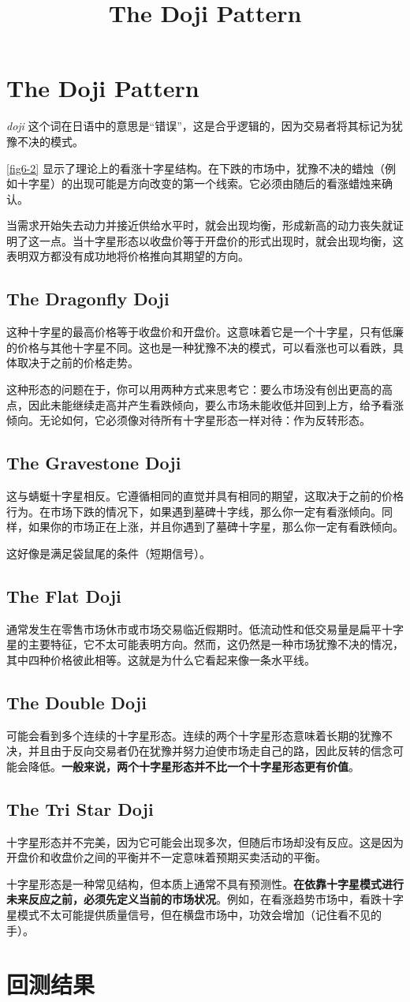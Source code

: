 \documentclass{article}
\title{The Doji Pattern}
\begin{document}
\section*{The Doji Pattern}
\textit{doji} 这个词在日语中的意思是“错误”，这是合乎逻辑的，因为交易者将其标记为犹豫不决的模式。


\autoref{fig6-2} 显示了理论上的看涨十字星结构。在下跌的市场中，犹豫不决的蜡烛（例如十字星）的出现可能是方向改变的第一个线索。它必须由随后的看涨蜡烛来确认。

当需求开始失去动力并接近供给水平时，就会出现均衡，形成新高的动力丧失就证明了这一点。当十字星形态以收盘价等于开盘价的形式出现时，就会出现均衡，这表明双方都没有成功地将价格推向其期望的方向。
\subsection*{The Dragonfly Doji}
这种十字星的最高价格等于收盘价和开盘价。这意味着它是一个十字星，只有低廉的价格与其他十字星不同。这也是一种犹豫不决的模式，可以看涨也可以看跌，具体取决于之前的价格走势。

这种形态的问题在于，你可以用两种方式来思考它：要么市场没有创出更高的高点，因此未能继续走高并产生看跌倾向，要么市场未能收低并回到上方，给予看涨倾向。无论如何，它必须像对待所有十字星形态一样对待：作为反转形态。
\subsection*{The Gravestone Doji}
这与蜻蜓十字星相反。它遵循相同的直觉并具有相同的期望，这取决于之前的价格行为。在市场下跌的情况下，如果遇到墓碑十字线，那么你一定有看涨倾向。同样，如果你的市场正在上涨，并且你遇到了墓碑十字星，那么你一定有看跌倾向。

这好像是满足袋鼠尾的条件（短期信号）。
\subsection*{The Flat Doji}
通常发生在零售市场休市或市场交易临近假期时。低流动性和低交易量是扁平十字星的主要特征，它不太可能表明方向。然而，这仍然是一种市场犹豫不决的情况，其中四种价格彼此相等。这就是为什么它看起来像一条水平线。
\subsection*{The Double Doji}
可能会看到多个连续的十字星形态。连续的两个十字星形态意味着长期的犹豫不决，并且由于反向交易者仍在犹豫并努力迫使市场走自己的路，因此反转的信念可能会降低。\textbf{一般来说，两个十字星形态并不比一个十字星形态更有价值}。
\subsection*{The Tri Star Doji}

十字星形态并不完美，因为它可能会出现多次，但随后市场却没有反应。这是因为开盘价和收盘价之间的平衡并不一定意味着预期买卖活动的平衡。

十字星形态是一种常见结构，但本质上通常不具有预测性。\textbf{在依靠十字星模式进行未来反应之前，必须先定义当前的市场状况}。例如，在看涨趋势市场中，看跌十字星模式不太可能提供质量信号，但在横盘市场中，功效会增加（记住看不见的手）。
\section*{回测结果}
\end{document}
